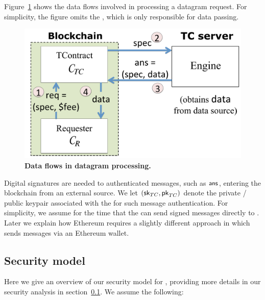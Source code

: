 Figure~\ref{fig:dataflow} shows the data flows involved in processing a datagram request. For simplicity, the figure omits the \medname, which is only responsible for data passing.


\begin{figure}[h!]
\centering
\includegraphics[width=\columnwidth]{figures/DataflowFig}
\caption{{\bf Data flows in datagram processing.}}
\label{fig:dataflow}
\end{figure}


Digital signatures are needed to authenticated messages, such as ${\sf ans}$, entering the blockchain from an external source. We let $({{\sf sk}_{TC}}, {\sf pk}_{TC})$ denote the private / public keypair associated with the \encname for such message authentication. For simplicity, we assume for the time that the \encname can send signed messages directly to \tcont. Later we explain how Ethereum requires a slightly different approach in which \tc sends messages via an Ethereum wallet.

\subsection{Security model}

Here we give an overview of our security model for \tc, providing more details in our security analysis in section~\ref{}. We assume the following:

